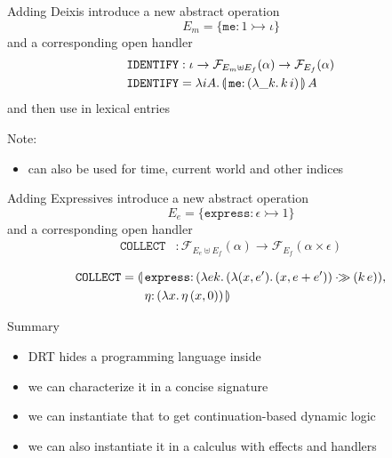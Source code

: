\documentclass{beamer}
\newcommand{\apr}{\mathbin{\cdot\!\!\gg}}
\newcommand{\lban}{\llparenthesis \,}
\newcommand{\rban}{\, \rrparenthesis}
\newcommand{\banana}[1]{\lban #1 \rban}
\newcommand{\lam}[2]{\lambda #1.\, #2}
\newcommand{\ap}[2]{#1\,#2}
\newcommand{\op}[1]{\mathtt{#1}}
\newcommand{\onto}[1]{#1 \mathalpha{:\,}}
\newcommand{\typedop}[3]{\op{#1} : #2 \rightarrowtail #3}
\newcommand{\FF}{\mathcal{F}}
\begin{document}
\begin{frame}{Adding Deixis}
  introduce a new abstract operation
  $$
  E_m = \{ \typedop{me}{1}{\iota} \}
  $$
  \vfill
  \pause
  and a corresponding open handler
  \begin{align*}
    \texttt{IDENTIFY} &: \iota \to \FF_{E_m \uplus E_f}(\alpha) \to \FF_{E_f}(\alpha) \\
    \texttt{IDENTIFY} &= \lam{i A}{\ap{\banana{\onto{\op{me}}{(\lam{\_ k}{\ap{k}{i}})}}}{A}}
  \end{align*}
  \vfill
  \pause
  and then use in lexical entries
  \pause

  Note:
  \begin{itemize}
  \item can also be used for time, current world and other indices
  \end{itemize}
\end{frame}

\begin{frame}{Adding Expressives}
  introduce a new abstract operation
  $$
  E_e = \{ \typedop{express}{\epsilon}{1} \}
  $$
  \vfill
  \pause
  and a corresponding open handler
  \begin{align*}
    \texttt{COLLECT} &: \FF_{E_e \uplus E_f}(\alpha) \to \FF_{E_f}(\alpha \times \epsilon) \\
  \end{align*}
  \vspace{-1cm}
  \begin{align*}
    \texttt{COLLECT} = \banana{&\onto{\op{express}}{(\lam{e k}{(\lam{(x,
            e')}{(x, e + e')}) \apr (\ap{k}{e})})}, \\
                               &\onto{\eta}{(\lam{x}{\ap{\eta}{(x, 0)}})}}
  \end{align*}
\end{frame}



\begin{frame}{Summary}
  \begin{itemize}
  \item DRT hides a programming language inside
    \pause
  \item we can characterize it in a concise signature
    \pause
  \item we can instantiate that to get continuation-based dynamic logic
    \pause
  \item we can also instantiate it in a calculus with effects and handlers
  \end{itemize}
\end{frame}
\end{document}
